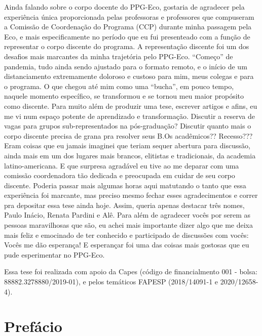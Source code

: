 \documentclass[12pt,openright,oneside,a4paper,english]{abntex2}
\begin{document}
\begin{agradecimentos}[Agradecimentos]
Ainda falando sobre o corpo docente do PPG-Eco, gostaria de agradecer pela experiência única proporcionada pelas professoras e professores que compuseram a Comissão de Coordenação do Programa (CCP) durante minha passagem pela Eco, e mais especificamente no período que eu fui presenteado com a função de representar o corpo discente do programa. A representação discente foi um dos desafios mais marcantes da minha trajetória pelo PPG-Eco. “Começo” de pandemia, tudo ainda sendo ajustado para o formato remoto, e o início de um distanciamento extremamente doloroso e custoso para mim, meus colegas e para o programa. O que chegou até mim como uma “bucha”, em pouco tempo, naquele momento específico, se transformou e se tornou meu maior propósito como discente. Para muito além de produzir uma tese, escrever artigos e afins, eu me vi num espaço potente de aprendizado e transformação. Discutir a reserva de vagas para grupos sub-representados na pós-graduação? Discutir quanto mais o corpo discente precisa de grana pra resolver seus B.Os acadêmicos?? Recesso??? Eram coisas que eu jamais imaginei que teriam sequer abertura para discussão, ainda mais em um dos lugares mais brancos, elitistas e tradicionais, da academia latino-americana. E que surpresa agradável eu tive ao me deparar com uma comissão coordenadora tão dedicada e preocupada em cuidar de seu corpo discente. Poderia passar mais algumas horas aqui matutando o tanto que essa experiência foi marcante, mas preciso mesmo fechar esses agradecimentos e correr pra depositar essa tese ainda hoje. Assim, queria apenas destacar três nomes, Paulo Inácio, Renata Pardini e Alê. Para além de agradecer vocês por serem as pessoas maravilhosas que são, eu achei mais importante dizer algo que me deixa mais feliz e emocinado de ter conhecido e participado de discussões com vocês: Vocês me dão esperança! E esperançar foi uma das coisas mais gostosas que eu pude esperimentar no PPG-Eco.

Essa tese foi realizada com apoio da Capes (código de financialmento 001 - bolsa: 88882.3278880/2019-01), e pelos temáticos FAPESP (2018/14091-1 e 2020/12658-4).

\end{agradecimentos}

\chapter*[Prefácio]{Prefácio}
\end{document}
